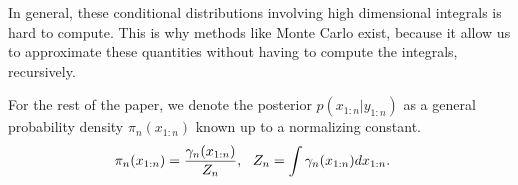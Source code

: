 In general, these conditional distributions involving high dimensional integrals is hard to compute. This is why methods like Monte Carlo exist, because it allow us to approximate these quantities without having to compute the integrals, recursively.  

For the rest of the paper, we denote the posterior $p(x_{1:n}|y_{1:n})$ as a general probability density $\pi_n(x_{1:n})$ known up to a normalizing constant.
\begin{align}
\pi_n(x_{1:n}) = \dfrac{\gamma_n(x_{1:n})}{Z_n}, &{\hspace{3mm} Z_n = \int \gamma_n(x_{1:n}) d{x_{1:n}}}.
\end{align}
